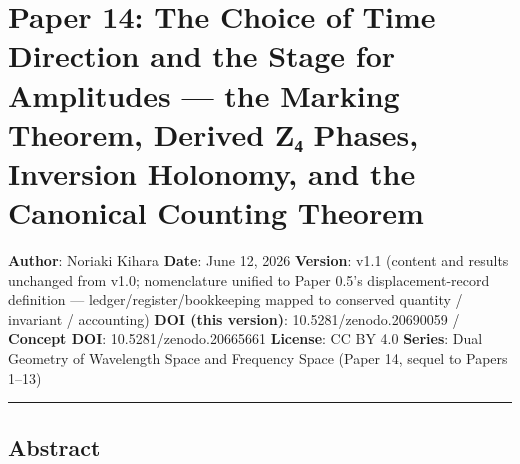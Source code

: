 \documentclass[
]{ltjsarticle}
\author{}
\date{}
\begin{document}
\section{Paper 14: The Choice of Time Direction and the Stage for
Amplitudes --- the Marking Theorem, Derived Z₄ Phases, Inversion
Holonomy, and the Canonical Counting
Theorem}\label{paper-14-the-choice-of-time-direction-and-the-stage-for-amplitudes-the-marking-theorem-derived-zux2084-phases-inversion-holonomy-and-the-canonical-counting-theorem}

\textbf{Author}: Noriaki Kihara \textbf{Date}: June 12, 2026
\textbf{Version}: v1.1 (content and results unchanged from v1.0;
nomenclature unified to Paper 0.5's displacement-record definition ---
ledger/register/bookkeeping mapped to conserved quantity / invariant /
accounting) \textbf{DOI (this version)}: 10.5281/zenodo.20690059 /
\textbf{Concept DOI}: 10.5281/zenodo.20665661 \textbf{License}: CC BY
4.0 \textbf{Series}: Dual Geometry of Wavelength Space and Frequency
Space (Paper 14, sequel to Papers 1--13)

\begin{center}\rule{0.5\linewidth}{0.5pt}\end{center}

\subsection{Abstract}\label{abstract}
\end{document}
